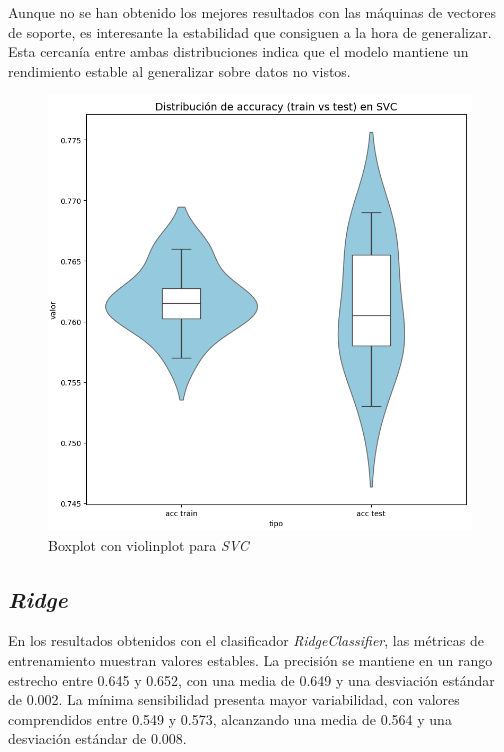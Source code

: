 \vspace{1em}

Aunque no se han obtenido los mejores resultados con las máquinas de vectores de soporte, es interesante la estabilidad que consiguen a la hora de generalizar. Esta cercanía entre ambas distribuciones indica que el modelo mantiene un rendimiento estable al generalizar sobre datos no vistos.

\begin{figure}[H]
	\centering
	\includegraphics[width=1\linewidth]{Imagenes/svm_bin}
	\caption[Boxplot con violinplot para \textit{SVC}]{Boxplot con violinplot para \textit{SVC}}
	\label{fig:svm_bin}
\end{figure}

\newpage
\subsection{\textit{Ridge}}
\label{subsec:ridge_bin}

En los resultados obtenidos con el clasificador \textit{RidgeClassifier}, las métricas de entrenamiento muestran valores estables. La precisión se mantiene en un rango estrecho entre 0.645 y 0.652, con una media de 0.649 y una desviación estándar de 0.002. La mínima sensibilidad presenta mayor variabilidad, con valores comprendidos entre 0.549 y 0.573, alcanzando una media de 0.564 y una desviación estándar de 0.008.

